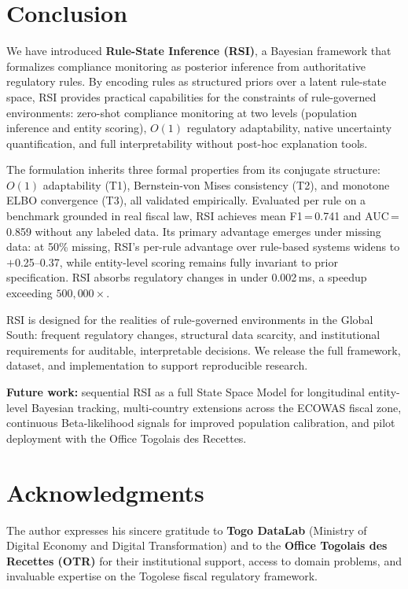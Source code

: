 \documentclass[letterpaper]{article}
\begin{document}
\section{Conclusion}
\label{sec:conclusion}

We have introduced \textbf{Rule-State Inference (RSI)}, a Bayesian
framework that formalizes compliance monitoring as posterior inference
from authoritative regulatory rules. By encoding rules as structured
priors over a latent rule-state space, RSI provides practical
capabilities for the constraints of rule-governed environments:
zero-shot compliance monitoring at two levels (population inference
and entity scoring), $O(1)$ regulatory adaptability, native
uncertainty quantification, and full interpretability without
post-hoc explanation tools.

The formulation inherits three formal properties from its conjugate
structure: $O(1)$ adaptability (T1), Bernstein-von Mises consistency
(T2), and monotone ELBO convergence (T3), all validated empirically.
Evaluated per rule on a benchmark grounded in real fiscal law, RSI
achieves mean F1\,=\,0.741 and AUC\,=\,0.859 without any labeled data.
Its primary advantage emerges under missing data: at 50\% missing,
RSI's per-rule advantage over rule-based systems widens to
$+$0.25--0.37, while entity-level scoring remains fully invariant to
prior specification. RSI absorbs regulatory changes in under
0.002\,ms, a speedup exceeding $500{,}000\times$.

RSI is designed for the realities of rule-governed environments in the
Global South: frequent regulatory changes, structural data scarcity,
and institutional requirements for auditable, interpretable decisions.
We release the full framework, dataset, and implementation to support
reproducible research.

\medskip
\noindent\textbf{Future work:} sequential RSI as a full State Space
Model for longitudinal entity-level Bayesian tracking, multi-country
extensions across the ECOWAS fiscal zone, continuous Beta-likelihood
signals for improved population calibration, and pilot deployment
with the Office Togolais des Recettes.

\section*{Acknowledgments}

The author expresses his sincere gratitude to \textbf{Togo DataLab}
(Ministry of Digital Economy and Digital Transformation) and to the
\textbf{Office Togolais des Recettes (OTR)} for their institutional
support, access to domain problems, and invaluable expertise on the
Togolese fiscal regulatory framework.
\end{document}
